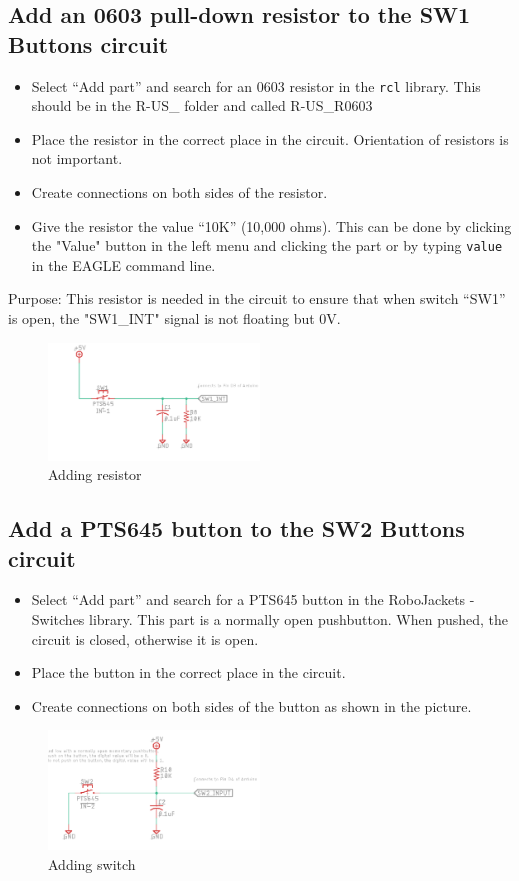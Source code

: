 \documentclass{article}
\begin{document}
\subsection{Add an 0603 pull-down resistor to the SW1 Buttons circuit}
\begin{itemize}
    \item Select “Add part” and search for an 0603 resistor in the \texttt{rcl} library. This should be in the R-US\_ folder and called R-US\_R0603
    \item  Place the resistor in the correct place in the circuit. Orientation of resistors is not important.
    \item Create connections on both sides of the resistor.
    \item Give the resistor the value “10K” (10,000 ohms). This can be done by clicking the "Value" button in the left menu and clicking the part or by typing \texttt{value} in the EAGLE command line. 
\end{itemize}
Purpose: This resistor is needed in the circuit to ensure that when switch “SW1” is open, the "SW1\_INT" signal is not floating but 0V.
\begin{figure}[ht]
	\center
	\includegraphics[width=0.5\textwidth, keepaspectratio]{images/5.1.png}
	\caption{Adding resistor}
	\label{fig:5.1}
\end{figure}
\subsection{Add a PTS645 button to the SW2 Buttons circuit}
\begin{itemize}
    \item  Select “Add part” and search for a PTS645 button in the RoboJackets - Switches library. This part is a normally open pushbutton. When pushed, the circuit is closed, otherwise it is open.
    \item Place the button in the correct place in the circuit.
    \item Create connections on both sides of the button as shown in the picture.
\end{itemize}
\begin{figure}[ht]
	\center
	\includegraphics[width=0.5\textwidth, keepaspectratio]{images/5.2.png}
	\caption{Adding switch}
	\label{fig:5.2}
\end{figure}
\end{document}
